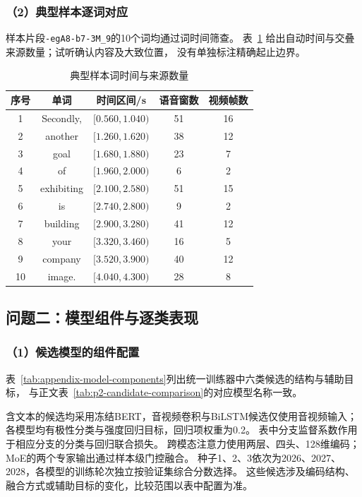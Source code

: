 \subsubsection*{（2）典型样本逐词对应}
样本片段\texttt{-egA8-b7-3M\_9}的10个词均通过词时间筛查。
表~\ref{tab:appendix-word-times} 给出自动时间与交叠来源数量；试听确认内容及大致位置，
没有单独标注精确起止边界。
\begin{table}[htbp]
\centering
\caption{典型样本词时间与来源数量}\label{tab:appendix-word-times}
\begin{tabular*}{\linewidth}{@{\extracolsep{\fill}}ccccc@{}}
\toprule
序号 & 单词 & 时间区间/s & 语音窗数 & 视频帧数\\\midrule
1 & Secondly, & $[0.560, 1.040)$ & 51 & 16 \\
2 & another & $[1.260, 1.620)$ & 38 & 12 \\
3 & goal & $[1.680, 1.880)$ & 23 & 7 \\
4 & of & $[1.960, 2.000)$ & 6 & 2 \\
5 & exhibiting & $[2.100, 2.580)$ & 51 & 15 \\
6 & is & $[2.740, 2.800)$ & 9 & 2 \\
7 & building & $[2.900, 3.280)$ & 41 & 12 \\
8 & your & $[3.320, 3.460)$ & 16 & 5 \\
9 & company & $[3.520, 3.900)$ & 40 & 12 \\
10 & image. & $[4.040, 4.300)$ & 28 & 8 \\
\bottomrule
\end{tabular*}
\end{table}

\subsection{问题二：模型组件与逐类表现}
\subsubsection*{（1）候选模型的组件配置}
表~\ref{tab:appendix-model-components}列出统一训练器中六类候选的结构与辅助目标，
与正文表~\ref{tab:p2-candidate-comparison}的对应模型名称一致。

含文本的候选均采用冻结BERT，音视频卷积与BiLSTM候选仅使用音视频输入；
各模型均有极性分类与强度回归目标，回归项权重为0.2。
表中分支监督系数作用于相应分支的分类与回归联合损失。
跨模态注意力使用两层、四头、128维编码；MoE的两个专家输出通过样本级门控融合。
种子1、2、3依次为2026、2027、2028，各模型的训练轮次独立按验证集综合分数选择。
这些候选涉及编码结构、融合方式或辅助目标的变化，比较范围以表中配置为准。


